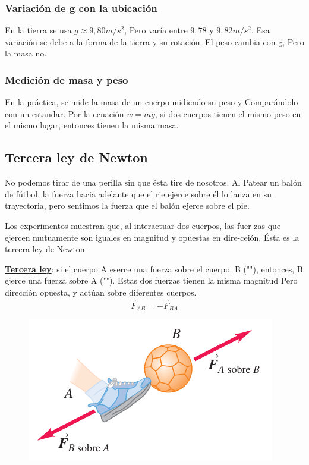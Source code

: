 \documentclass{article}
\newcommand{\newsubsection}[1]{
    \vspace{0.5cm}
    \color{sectionColor}
    \subsection{ #1}
    \color{black}
    \vspace{0.5cm}
}
\newcommand{\newtitle}[1]{
    \color{titleColor}
    \subsubsection{\textbf{#1}}
    \color{black}
}
\newcommand{\bl}[1]{\textbf{#1}}
\newcommand{\definicion}[1]{%
    \vspace{0.5cm}
    \begin{definicionbox}
        #1
    \end{definicionbox}
    \vspace{0.5cm}
}
\begin{document}
    \newtitle{Variación de g con la ubicación}

    \par En la tierra se usa $g \approx 9,80 m/s^2$, Pero varía entre $9,78$ y $9,82 m/s^2$. Esa variación se debe a la forma de la tierra y su rotación. El peso cambia con g, Pero la masa no.

    \vspace{3cm}

    \newtitle{Medición de masa y peso}

    \par En la práctica, se mide la masa de un cuerpo midiendo su peso y Comparándolo con un estandar. Por la ecuación $w=mg$, si dos cuerpos tienen el mismo peso en el mismo lugar, entonces tienen la misma masa.

    \newsubsection{Tercera ley de Newton}

    \par No podemos tirar de una perilla sin que ésta tire de nosotros. Al Patear un balón de fútbol, la fuerza hacia adelante que el rie ejerce sobre él lo lanza en su trayectoria, pero sentimos la fuerza que el balón ejerce sobre el pie.
    \par Los experimentos muestran que, al interactuar dos cuerpos, las fuer-zas que ejercen mutuamente son iguales en magnitud y opuestas en dire-ceión. Ésta es la tercera ley de Newton.

    \definicion{
        \par \color{blue}\underline{\bl{Tercera ley}}\color{black}: si el cuerpo A eserce una fuerza sobre el cuerpo. B ("\text{acción}"), entonces, B ejerce una fuerza sobre A ("\text{reacción}"). Estas dos fuerzas tienen la misma magnitud Pero dirección opuesta, y actúan sobre diferentes cuerpos.
        \[\vec{F}_{AB} = - \vec{F}_{BA}\]
    }

    \begin{figure}[H]
        \centering
        \includegraphics[scale=0.8]{img/2.5-1.png}
    \end{figure}
\end{document}
